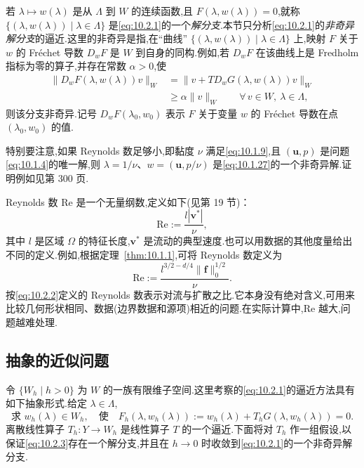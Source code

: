 若 \(\lambda\mapsto w(\lambda)\) 是从 \(\Lambda\) 到 \(W\) 的连续函数,且 \(F(\lambda,w(\lambda))=0\),就称 \(\{(\lambda,w(\lambda))\mid\lambda\in\Lambda\}\) 是\eqref{eq:10.2.1}的一个\emph{解分支}.本节只分析\eqref{eq:10.2.1}的\emph{非奇异解分支}的逼近.这里的非奇异是指,在“曲线” \(\{(\lambda,w(\lambda))\mid\lambda\in\Lambda\}\) 上,映射 \(F\) 关于 \(w\) 的 Fréchet 导数 \(D_wF\) 是 \(W\) 到自身的同构.例如,若 \(D_wF\) 在该曲线上是 Fredholm 指标为零的算子,并存在常数 \(\alpha>0\),使
\[
  \begin{aligned}
    \|D_wF(\lambda,w(\lambda))v\|_W
      &=\|v+TD_wG(\lambda,w(\lambda))v\|_W\\
      &\ge\alpha\|v\|_W\qquad\forall\,v\in W,\ \lambda\in\Lambda,
  \end{aligned}
\]
则该分支非奇异.记号 \(D_wF(\lambda_0,w_0)\) 表示 \(F\) 关于变量 \(w\) 的 Fréchet 导数在点 \((\lambda_0,w_0)\) 的值.

特别要注意,如果 Reynolds 数足够小,即黏度 \(\nu\) 满足\eqref{eq:10.1.9},且 \((\boldsymbol{u},p)\) 是问题\eqref{eq:10.1.4}的唯一解,则 \(\lambda=1/\nu\)、\(w=(\boldsymbol{u},p/\nu)\) 是\eqref{eq:10.1.27}的一个非奇异解.证明例如见第 300 页.

Reynolds 数 \(\mathrm{Re}\) 是一个无量纲数,定义如下(见第 19 节)：
\begin{equation}\label{eq:10.2.2}
  \mathrm{Re}:=\frac{l|\boldsymbol{v}^*|}{\nu},
\end{equation}
其中 \(l\) 是区域 \(\Omega\) 的特征长度,\(\boldsymbol{v}^*\) 是流动的典型速度.也可以用数据的其他度量给出不同的定义.例如,根据定理~\ref{thm:10.1.1},可将 Reynolds 数定义为
\[
  \mathrm{Re}:=\frac{l^{3/2-d/4}\|\boldsymbol{f}\|_0^{1/2}}{\nu}.
\]
按\eqref{eq:10.2.2}定义的 Reynolds 数表示对流与扩散之比.它本身没有绝对含义,可用来比较几何形状相同、数据(边界数据和源项)相近的问题.在实际计算中,\(\mathrm{Re}\) 越大,问题越难处理.

\subsection{抽象的近似问题}\label{sec:10.2.1}

令 \(\{W_h\mid h>0\}\) 为 \(W\) 的一族有限维子空间.这里考察的\eqref{eq:10.2.1}的逼近方法具有如下抽象形式.给定 \(\lambda\in\Lambda\),
\begin{equation}\label{eq:10.2.3}
  \text{求 }w_h(\lambda)\in W_h,\quad\text{使}\quad
    F_h(\lambda,w_h(\lambda)):=w_h(\lambda)+T_hG(\lambda,w_h(\lambda))=0.
\end{equation}
离散线性算子 \(T_h\colon Y\to W_h\) 是线性算子 \(T\) 的一个逼近.下面将对 \(T_h\) 作一组假设,以保证\eqref{eq:10.2.3}存在一个解分支,并且在 \(h\to0\) 时收敛到\eqref{eq:10.2.1}的一个非奇异解分支.

